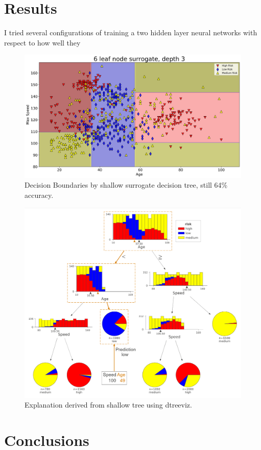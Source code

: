\documentclass{article} %
\begin{document}
\section{Results}

I tried several configurations of training a two hidden layer neural networks with respect to how well they 

\begin{figure}[h]
\begin{center}
\includegraphics[width=\linewidth]{shallow-surrogate.png}
\end{center}
\caption{Decision Boundaries by shallow surrogate decision tree, still 64\% accuracy.}
\end{figure}

\begin{figure}[h]
\begin{center}
\includegraphics[width=\linewidth]{dtreeviz-prediction-path.png}
\end{center}
\caption{Explanation derived from shallow tree using dtreeviz.}
\end{figure}


\section{Conclusions}


\end{document}
